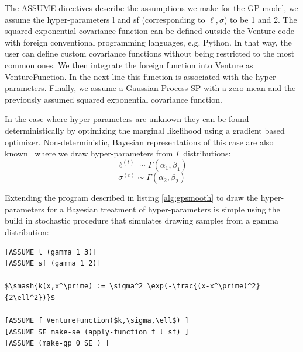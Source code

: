\documentclass{article} %
\begin{document}
The ASSUME directives describe the assumptions we make for the GP model, we assume the hyper-parameters l and sf (corresponding to $\ell,\sigma$) to be 1 and 2. The squared exponential covariance function can be defined outside the Venture code with foreign conventional programming languages, e.g. Python. In that way, the user can define custom covariance functions without being restricted to the most common ones. We then integrate the foreign function into Venture as VentureFunction. In the next line this function is associated with the hyper-parameters. Finally, we assume a Gaussian Process SP with a zero mean and the previously assumed squared exponential covariance function.





In the case where hyper-parameters are unknown they can be found deterministically by optimizing the marginal likelihood using a gradient based optimizer. Non-deterministic, Bayesian representations of this case are also known~\citep{neal1997monte} where we draw hyper-parameters from $\Gamma$ distributions:
\begin{equation}
\ell^{(t)} \sim \Gamma(\alpha_1,\beta_1)
\end{equation}
\begin{equation}
\sigma^{(t)} \sim \Gamma(\alpha_2,\beta_2)
\end{equation}

Extending the program described in listing \ref{alg:gpsmooth} to draw the hyper-parameters for a Bayesian treatment of hyper-parameters is simple using the build in stochastic procedure that simulates drawing samples from a gamma distribution:

\begin{minipage}{\linewidth}
\begin{lstlisting}[frame=single,label=alg:gpNeal,caption=Bayesian GP Smoothing,mathescape]
[ASSUME l (gamma 1 3)]
[ASSUME sf (gamma 1 2)]

$\smash{k(x,x^\prime) := \sigma^2 \exp(-\frac{(x-x^\prime)^2}{2\ell^2})}$

[ASSUME f VentureFunction($k,\sigma,\ell$) ]
[ASSUME SE make-se (apply-function f l sf) ]
[ASSUME (make-gp 0 SE ) ]
\end{lstlisting}
\end{minipage}
\end{document}
